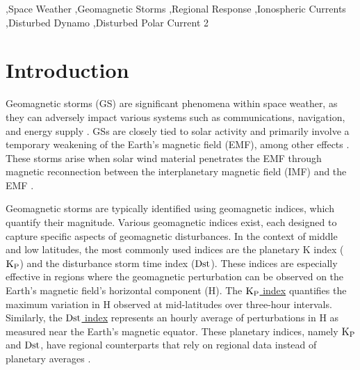 \documentclass[a4paper,fleqn]{cas-dc}
\begin{document}
\begin{keywords}
 \sep Space Weather \sep Geomagnetic Storms \sep Regional Response \sep Ionospheric Currents \sep Disturbed Dynamo \sep Disturbed Polar Current 2  
\end{keywords}

\maketitle
\section{Introduction}
     \label{S-Introduction} 



Geomagnetic storms (GS) are significant phenomena within space weather, as they can adversely impact various systems such as communications, navigation, and energy supply \citep{schrijver2015}. GSs are closely tied to solar activity and primarily involve a temporary weakening of the Earth's magnetic field (EMF), among other effects \citep{gonzalestgm}. These storms arise when solar wind material penetrates the EMF through magnetic reconnection between the interplanetary magnetic field (IMF) and the EMF \cite{l_basic_spaceplasmaphysic, l_russell}.

Geomagnetic storms are typically identified using geomagnetic indices, which quantify their magnitude. Various geomagnetic indices exist, each designed to capture specific aspects of geomagnetic disturbances. In the context of middle and low latitudes, the most commonly used indices are the planetary K index (${\rm K_P}$) and the disturbance storm time index (${\rm Dst}$). These indices are especially effective in regions where the geomagnetic perturbation can be observed on the Earth's magnetic field's horizontal component (H). The \href{https://www.gfz-potsdam.de/en/section/geomagnetism/data-products-services/geomagnetic-kp-index}{${\rm K_P}$ index} quantifies the maximum variation in H observed at mid-latitudes over three-hour intervals. Similarly, the \href{https://wdc.kugi.kyoto-u.ac.jp/dstae/index.html}{${\rm Dst}$ index} represents an hourly average of perturbations in H as measured near the Earth's magnetic equator. These planetary indices, namely ${\rm K_P}$ and ${\rm Dst}$, have regional counterparts that rely on regional data instead of planetary averages \citep{mayaud1980}.
\end{document}

